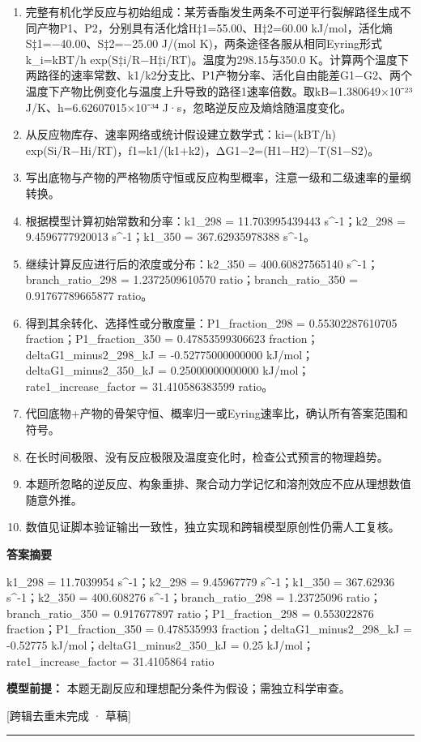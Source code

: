 \documentclass[UTF8,11pt,a4paper]{ctexart}
\begin{document}
\begin{enumerate}
\item 完整有机化学反应与初始组成：某芳香酯发生两条不可逆平行裂解路径生成不同产物P1、P2，分别具有活化焓H‡1=55.00、H‡2=60.00 kJ/mol，活化熵S‡1=−40.00、S‡2=−25.00 J/(mol K)，两条途径各服从相同Eyring形式k\_i=kBT/h exp(S‡i/R−H‡i/RT)。温度为298.15与350.0 K。计算两个温度下两路径的速率常数、k1/k2分支比、P1产物分率、活化自由能差G1−G2、两个温度下产物比例变化与温度上升导致的路径1速率倍数。取kB=1.380649×10⁻²³ J/K、h=6.62607015×10⁻³⁴ J·s，忽略逆反应及熵焓随温度变化。
\item 从反应物库存、速率网络或统计假设建立数学式：ki=(kBT/h) exp(Si/R−Hi/RT)，f1=k1/(k1+k2)，ΔG1−2=(H1−H2)−T(S1−S2)。
\item 写出底物与产物的严格物质守恒或反应构型概率，注意一级和二级速率的量纲转换。
\item 根据模型计算初始常数和分率：k1\_298 = 11.703995439443 s\textasciicircum{}-1；k2\_298 = 9.4596777920013 s\textasciicircum{}-1；k1\_350 = 367.62935978388 s\textasciicircum{}-1。
\item 继续计算反应进行后的浓度或分布：k2\_350 = 400.60827565140 s\textasciicircum{}-1；branch\_ratio\_298 = 1.2372509610570 ratio；branch\_ratio\_350 = 0.91767789665877 ratio。
\item 得到其余转化、选择性或分散度量：P1\_fraction\_298 = 0.55302287610705 fraction；P1\_fraction\_350 = 0.47853599306623 fraction；deltaG1\_minus2\_298\_kJ = -0.52775000000000 kJ/mol；deltaG1\_minus2\_350\_kJ = 0.25000000000000 kJ/mol；rate1\_increase\_factor = 31.410586383599 ratio。
\item 代回底物+产物的骨架守恒、概率归一或Eyring速率比，确认所有答案范围和符号。
\item 在长时间极限、没有反应极限及温度变化时，检查公式预言的物理趋势。
\item 本题所忽略的逆反应、构象重排、聚合动力学记忆和溶剂效应不应从理想数值随意外推。
\item 数值见证脚本验证输出一致性，独立实现和跨辑模型原创性仍需人工复核。
\end{enumerate}
\noindent\textbf{答案摘要}\par
k1\_298 = 11.7039954 s\textasciicircum{}-1；k2\_298 = 9.45967779 s\textasciicircum{}-1；k1\_350 = 367.62936 s\textasciicircum{}-1；k2\_350 = 400.608276 s\textasciicircum{}-1；branch\_ratio\_298 = 1.23725096 ratio；branch\_ratio\_350 = 0.917677897 ratio；P1\_fraction\_298 = 0.553022876 fraction；P1\_fraction\_350 = 0.478535993 fraction；deltaG1\_minus2\_298\_kJ = -0.52775 kJ/mol；deltaG1\_minus2\_350\_kJ = 0.25 kJ/mol；rate1\_increase\_factor = 31.4105864 ratio\par
\noindent\textbf{模型前提：}
本题无副反应和理想配分条件为假设；需独立科学审查。\par
\noindent\textcolor{red!65!black}{[跨辑去重未完成 · 草稿]} \par
\medskip\hrule\medskip
{}
\end{document}
